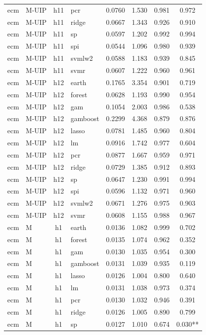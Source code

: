 \begin{ThreePartTable}
\begin{longtable}[t]{llclcccc}
ecm & M-UIP & h11 & pcr & 0.0760 & 1.530 & 0.981 & 0.972\\
ecm & M-UIP & h11 & ridge & 0.0667 & 1.343 & 0.926 & 0.910\\
ecm & M-UIP & h11 & sp & 0.0597 & 1.202 & 0.992 & 0.994\\
ecm & M-UIP & h11 & spi & 0.0544 & 1.096 & 0.980 & 0.939\\
ecm & M-UIP & h11 & svmlw2 & 0.0588 & 1.183 & 0.939 & 0.845\\
ecm & M-UIP & h11 & svmr & 0.0607 & 1.222 & 0.960 & 0.961\\
\addlinespace
ecm & M-UIP & h12 & earth & 0.1765 & 3.354 & 0.901 & 0.719\\
ecm & M-UIP & h12 & forest & 0.0628 & 1.193 & 0.990 & 0.954\\
ecm & M-UIP & h12 & gam & 0.1054 & 2.003 & 0.986 & 0.538\\
ecm & M-UIP & h12 & gamboost & 0.2299 & 4.368 & 0.879 & 0.876\\
ecm & M-UIP & h12 & lasso & 0.0781 & 1.485 & 0.960 & 0.804\\
ecm & M-UIP & h12 & lm & 0.0916 & 1.742 & 0.977 & 0.604\\
ecm & M-UIP & h12 & pcr & 0.0877 & 1.667 & 0.959 & 0.971\\
ecm & M-UIP & h12 & ridge & 0.0729 & 1.385 & 0.912 & 0.893\\
ecm & M-UIP & h12 & sp & 0.0647 & 1.230 & 0.991 & 0.994\\
ecm & M-UIP & h12 & spi & 0.0596 & 1.132 & 0.971 & 0.960\\
ecm & M-UIP & h12 & svmlw2 & 0.0671 & 1.276 & 0.975 & 0.903\\
ecm & M-UIP & h12 & svmr & 0.0608 & 1.155 & 0.988 & 0.967\\
\addlinespace
ecm & M & h1 & earth & 0.0136 & 1.082 & 0.999 & 0.702\\
ecm & M & h1 & forest & 0.0135 & 1.074 & 0.962 & 0.352\\
ecm & M & h1 & gam & 0.0130 & 1.035 & 0.954 & 0.300\\
ecm & M & h1 & gamboost & 0.0131 & 1.039 & 0.935 & 0.119\\
ecm & M & h1 & lasso & 0.0126 & 1.004 & 0.800 & 0.640\\
ecm & M & h1 & lm & 0.0131 & 1.038 & 0.973 & 0.374\\
ecm & M & h1 & pcr & 0.0130 & 1.032 & 0.946 & 0.391\\
ecm & M & h1 & ridge & 0.0126 & 1.005 & 0.890 & 0.799\\
ecm & M & h1 & sp & 0.0127 & 1.010 & 0.674 & 0.030**\\

\end{longtable}
\end{ThreePartTable}
